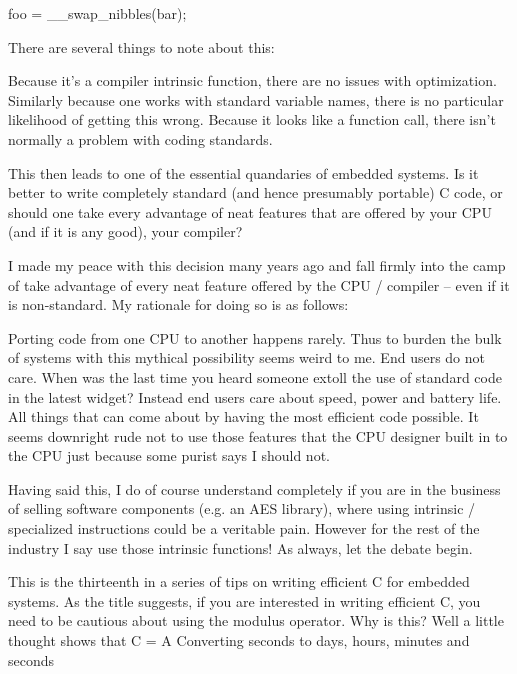 {{{{{{{{{{foo = __swap_nibbles(bar);

There are several things to note about this:

    Because it’s a compiler intrinsic function, there are no issues with optimization.
    Similarly because one works with standard variable names, there is no particular likelihood of getting this wrong.
    Because it looks like a function call, there isn’t normally a problem with coding standards.

This then leads to one of the essential quandaries of embedded systems. Is it better to write completely standard (and hence presumably portable) C code, or should one take every advantage of neat features that are offered by your CPU (and if it is any good), your compiler?

I made my peace with this decision many years ago and fall firmly into the camp of take advantage of every neat feature offered by the CPU / compiler – even if it is non-standard. My rationale for doing so is as follows:

    Porting code from one CPU to another happens rarely. Thus to burden the bulk of systems with this mythical possibility seems weird to me.
    End users do not care. When was the last time you heard someone extoll the use of standard code in the latest widget? Instead end users care about speed, power and battery life. All things that can come about by having the most efficient code possible.
    It seems downright rude not to use those features that the CPU designer built in to the CPU just because some purist says I should not.

Having said this, I do of course understand completely if you are in the business of selling software components (e.g. an AES library), where using intrinsic / specialized instructions could be a veritable pain. However for the rest of the industry I say use those intrinsic functions! As always, let the debate begin.

This is the thirteenth in a series of tips on writing efficient C for embedded systems.  As the title suggests, if you are interested in writing efficient C, you need to be cautious about using the modulus operator.  Why is this? Well a little thought shows that C = A %
Converting seconds to days, hours, minutes and seconds

}}}}}}}}}}
